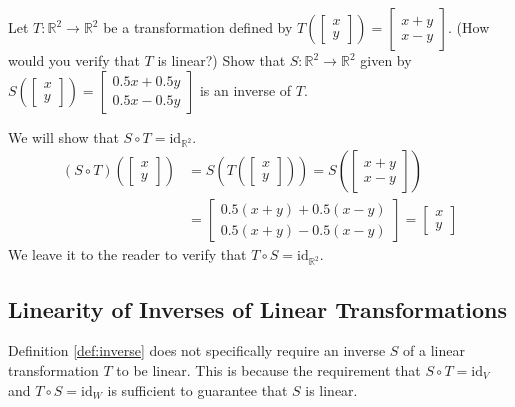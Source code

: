 \documentclass{ximera}
\newcommand{\RR}{\mathbb{R}}
\newcommand{\id}{\text{id}}
\begin{document}
\begin{example}\label{ex:inverseverify} Let $T:\RR^2\rightarrow \RR^2$ be a transformation defined by $T\left(\begin{bmatrix}x\\y\end{bmatrix}\right)=\begin{bmatrix}x+y\\x-y\end{bmatrix}$. (How would you verify that $T$ is linear?)  Show that $S:\RR^2\rightarrow \RR^2$ given by $S\left(\begin{bmatrix}x\\y\end{bmatrix}\right)=\begin{bmatrix}0.5x+0.5y\\0.5x-0.5y\end{bmatrix}$ is an inverse of $T$.
\begin{explanation}
We will show that $S\circ T=\id_{\RR^2}$.  
\begin{align*}
(S\circ T)\left(\begin{bmatrix}x\\y\end{bmatrix}\right)&=S\left(T\left(\begin{bmatrix}x\\y\end{bmatrix}\right)\right)=S\left(\begin{bmatrix}x+y\\x-y\end{bmatrix}\right)\\
&=\begin{bmatrix}0.5(x+y)+0.5(x-y)\\0.5(x+y)-0.5(x-y)\end{bmatrix}
=\begin{bmatrix}x\\y\end{bmatrix}
\end{align*}
We leave it to the reader to verify that $T\circ S=\id_{\RR^2}$.

\end{explanation}
\end{example}

\subsection*{Linearity of Inverses of Linear Transformations}

Definition \ref{def:inverse} does not specifically require an inverse $S$ of a linear transformation $T$ to be linear.  This is because the requirement that $S\circ T=\id_V$ and $T\circ S=\id_W$ is sufficient to guarantee that $S$ is linear.  
\end{document}
